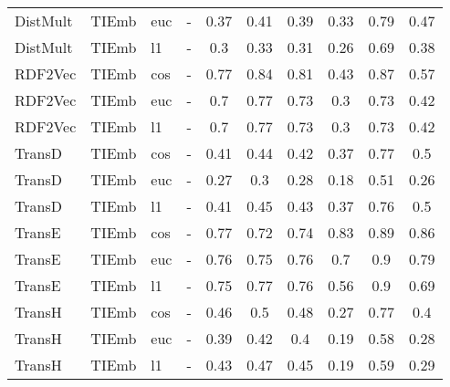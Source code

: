 \begin{longtable}{|llll|ccc|ccc|}
DistMult	&	TIEmb	&	euc	&	-	&	0.37	&	0.41	&	0.39	&	0.33	&	0.79	&	0.47 \\ 
DistMult	&	TIEmb	&	l1	&	-	&	0.3	&	0.33	&	0.31	&	0.26	&	0.69	&	0.38 \\ 
RDF2Vec	&	TIEmb	&	cos	&	-	&	0.77	&	0.84	&	0.81	&	0.43	&	0.87	&	0.57 \\ 
RDF2Vec	&	TIEmb	&	euc	&	-	&	0.7	&	0.77	&	0.73	&	0.3	&	0.73	&	0.42 \\ 
RDF2Vec	&	TIEmb	&	l1	&	-	&	0.7	&	0.77	&	0.73	&	0.3	&	0.73	&	0.42 \\ 
TransD	&	TIEmb	&	cos	&	-	&	0.41	&	0.44	&	0.42	&	0.37	&	0.77	&	0.5 \\ 
TransD	&	TIEmb	&	euc	&	-	&	0.27	&	0.3	&	0.28	&	0.18	&	0.51	&	0.26 \\ 
TransD	&	TIEmb	&	l1	&	-	&	0.41	&	0.45	&	0.43	&	0.37	&	0.76	&	0.5 \\ 
TransE	&	TIEmb	&	cos	&	-	&	0.77	&	0.72	&	0.74	&	0.83	&	0.89	&	0.86 \\ 
TransE	&	TIEmb	&	euc	&	-	&	0.76	&	0.75	&	0.76	&	0.7	&	0.9	&	0.79 \\ 
TransE	&	TIEmb	&	l1	&	-	&	0.75	&	0.77	&	0.76	&	0.56	&	0.9	&	0.69 \\ 
TransH	&	TIEmb	&	cos	&	-	&	0.46	&	0.5	&	0.48	&	0.27	&	0.77	&	0.4 \\ 
TransH	&	TIEmb	&	euc	&	-	&	0.39	&	0.42	&	0.4	&	0.19	&	0.58	&	0.28 \\ 
TransH	&	TIEmb	&	l1	&	-	&	0.43	&	0.47	&	0.45	&	0.19	&	0.59	&	0.29 \\ 
\hline
\end{longtable}
